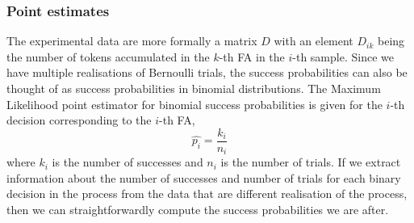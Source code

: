 \subsubsection{Point estimates}
The experimental data are more formally a matrix $D$ with an element $D_{ik}$ being
the number of tokens accumulated in the $k$-th FA in the $i$-th
sample. Since we have multiple
realisations of Bernoulli trials, the success probabilities can also be
thought of as success probabilities in binomial distributions. The
Maximum Likelihood point estimator for binomial success probabilities
is given for the $i$-th decision corresponding to the $i$-th FA,
\begin{equation*}
\hat{p_i} = \frac{k_i}{n_i}
\end{equation*}
where $k_i$ is the number of successes and $n_i$ is the number of
trials. If we extract information about the number of successes and
number of trials for each binary decision in the process from the data
that are different realisation of the process, then we can
straightforwardly compute the success probabilities we are after.

